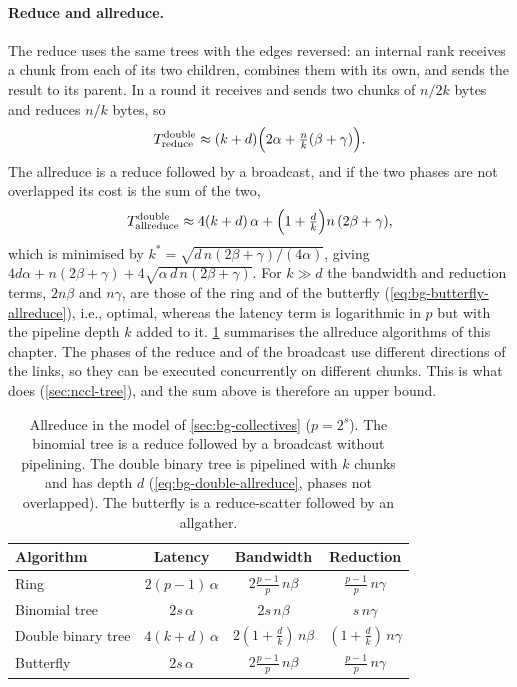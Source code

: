\paragraph{Reduce and allreduce.}
The reduce uses the same trees with the edges reversed: an internal rank receives a chunk from each of its two children, combines them with its own, and sends the result to its parent.
In a round it receives and sends two chunks of $n/2k$ bytes and reduces $n/k$ bytes, so
\begin{equation}
  T^{\text{double}}_{\text{reduce}} \approx (k+d)\Bigl(2\alpha+\tfrac{n}{k}(\beta+\gamma)\Bigr).
\end{equation}
The allreduce is a reduce followed by a broadcast, and if the two phases are not overlapped its cost is the sum of the two,
\begin{equation}
  T^{\text{double}}_{\text{allreduce}} \approx 4(k+d)\,\alpha+\Bigl(1+\tfrac{d}{k}\Bigr)n\,(2\beta+\gamma),
  \label{eq:bg-double-allreduce}
\end{equation}
which is minimised by $k^\ast=\sqrt{d\,n(2\beta+\gamma)/(4\alpha)}$, giving $4d\alpha+n(2\beta+\gamma)+4\sqrt{\alpha\,d\,n(2\beta+\gamma)}$.
For $k\gg d$ the bandwidth and reduction terms, $2n\beta$ and $n\gamma$, are those of the ring and of the butterfly (\cref{eq:bg-butterfly-allreduce}), i.e., optimal, whereas the latency term is logarithmic in $p$ but with the pipeline depth $k$ added to it.
\cref{tab:bg-allreduce-cost} summarises the allreduce algorithms of this chapter.
The phases of the reduce and of the broadcast use different directions of the links, so they can be executed concurrently on different chunks. This is what \nccl{} does (\cref{sec:nccl-tree}), and the sum above is therefore an upper bound.
\begin{table}[t]
\centering
\small
\caption{Allreduce in the model of \cref{sec:bg-collectives} ($p=2^s$). The binomial tree is a reduce followed by a broadcast without pipelining. The double binary tree is pipelined with $k$ chunks and has depth $d$ (\cref{eq:bg-double-allreduce}, phases not overlapped). The butterfly is a reduce-scatter followed by an allgather.}
\label{tab:bg-allreduce-cost}
\begin{tabular}{@{}lccc@{}}
\toprule
Algorithm & Latency & Bandwidth & Reduction \\
\midrule
Ring            & $2(p-1)\,\alpha$ & $2\tfrac{p-1}{p}\,n\beta$ & $\tfrac{p-1}{p}\,n\gamma$ \\
Binomial tree   & $2s\,\alpha$     & $2s\,n\beta$              & $s\,n\gamma$ \\
Double binary tree & $4(k+d)\,\alpha$ & $2(1+\tfrac{d}{k})\,n\beta$ & $(1+\tfrac{d}{k})\,n\gamma$ \\
Butterfly       & $2s\,\alpha$     & $2\tfrac{p-1}{p}\,n\beta$ & $\tfrac{p-1}{p}\,n\gamma$ \\
\bottomrule
\end{tabular}
\end{table}
